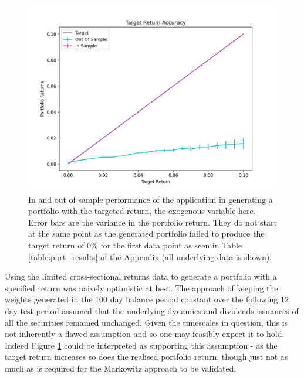 \documentclass{article}
\begin{document}
\begin{figure}[H]
	\centerline{\includegraphics[width=\textwidth]{figures/oos_accuracy.png}}
	\caption{In and out of sample performance of the application in generating a portfolio with the targeted return, the exogenous variable here. Error bars are the variance in the portfolio return. They do not start at the same point as the generated portfolio failed to produce the target return of 0\% for the first data point as seen in Table \ref{table:port_results} of the Appendix (all underlying data is shown).}
	\label{fig:oos_accuracy}
\end{figure}

Using the limited cross-sectional returns data to generate a portfolio with a specified return was naively optimistic at best. The approach of keeping the weights generated in the 100 day balance period constant over the following 12 day test period assumed that the underlying dynamics and dividends issuances of all the securities remained unchanged. Given the timescales in question, this is not inherently a flawed assumption and so one may feasibly expect it to hold. Indeed  Figure \ref{fig:oos_accuracy} could be interpreted as supporting this assumption - as the target return increases so does the realised portfolio return, though just not as much as is required for the Markowitz approach to be validated.
\end{document}
